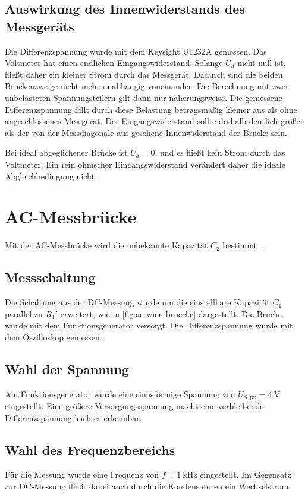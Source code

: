 \documentclass[11pt,a4paper]{scrartcl}
\begin{document}
\subsection{Auswirkung des Innenwiderstands des Messgeräts}
Die Differenzspannung wurde mit dem Keysight U1232A gemessen.
Das Voltmeter hat einen endlichen Eingangswiderstand. Solange $U_d$ nicht null ist, fließt daher ein kleiner Strom durch das Messgerät.
Dadurch sind die beiden Brückenzweige nicht mehr unabhängig voneinander. Die Berechnung mit zwei unbelasteten Spannungsteilern gilt dann nur näherungsweise.
Die gemessene Differenzspannung fällt durch diese Belastung betragsmäßig kleiner aus als ohne angeschlossenes Messgerät.
Der Eingangswiderstand sollte deshalb deutlich größer als der von der Messdiagonale aus gesehene Innenwiderstand der Brücke sein.

Bei ideal abgeglichener Brücke ist $U_d=0$, und es fließt kein Strom durch das Voltmeter.
Ein rein ohmscher Eingangswiderstand verändert daher die ideale Abgleichbedingung nicht.



\clearpage
\section{AC-Messbrücke}
Mit der AC-Messbrücke wird die unbekannte Kapazität $C_2$ bestimmt~\cite{laborskript}.

\subsection{Messschaltung}
Die Schaltung aus der DC-Messung wurde um die einstellbare Kapazität $C_1$ parallel zu $R_1'$ erweitert, wie in \cref{fig:ac-wien-bruecke} dargestellt.
Die Brücke wurde mit dem Funktionsgenerator versorgt. Die Differenzspannung wurde mit dem Oszilloskop gemessen.

\subsection{Wahl der Spannung}
Am Funktionsgenerator wurde eine sinusförmige Spannung von $U_{S,\mathrm{pp}}=\SI{4}{\volt}$ eingestellt.
Eine größere Versorgungsspannung macht eine verbleibende Differenzspannung leichter erkennbar.

\subsection{Wahl des Frequenzbereichs}
Für die Messung wurde eine Frequenz von $f=\SI{1}{\kilo\hertz}$ eingestellt.
Im Gegensatz zur DC-Messung fließt dabei auch durch die Kondensatoren ein Wechselstrom.
\end{document}
